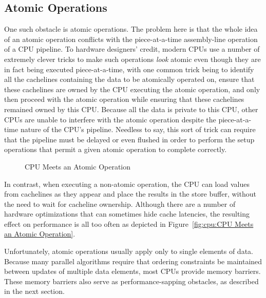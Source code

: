 \subsection{Atomic Operations}
\label{sec:cpu:Atomic Operations}

One such obstacle is atomic operations.
The problem here is that the whole idea of an atomic operation conflicts with
the piece-at-a-time assembly-line operation of a CPU pipeline.
To hardware designers' credit, modern CPUs use a number of extremely clever
tricks to make such operations \emph{look} atomic even though they
are in fact being executed piece-at-a-time,
with one common trick being to identify all the cachelines containing the
data to be atomically operated on,
ensure that these cachelines are owned by the CPU executing the
atomic operation, and only then proceed with the atomic operation
while ensuring that these cachelines remained owned by this CPU.
Because all the data is private to this CPU, other CPUs are unable to
interfere with the atomic operation despite the piece-at-a-time nature
of the CPU's pipeline.
Needless to say, this sort of trick can require that
the pipeline must be delayed or even flushed in order to
perform the setup operations that
permit a given atomic operation to complete correctly.

\begin{figure}[htb]
\centering
{}
\caption{CPU Meets an Atomic Operation}
\end{figure}

In contrast, when executing a non-atomic operation, the CPU can load
values from cachelines as they appear and place the results in the
store buffer, without the need to wait for cacheline ownership.
Although there are a number of hardware optimizations that can sometimes
hide cache latencies, the resulting effect on performance is all too
often as depicted in
Figure~\ref{fig:cpu:CPU Meets an Atomic Operation}.

Unfortunately, atomic operations usually apply only to single elements
of data.
Because many parallel algorithms require that ordering constraints
be maintained between updates of multiple data elements, most CPUs
provide memory barriers.
These memory barriers also serve as performance-sapping obstacles,
as described in the next section.


